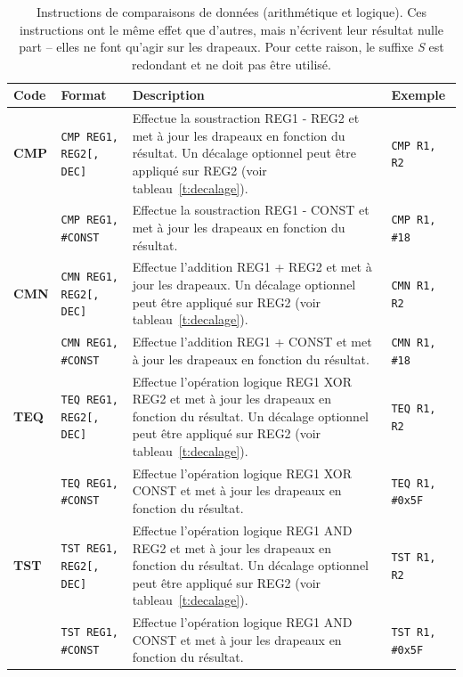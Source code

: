 \documentclass{tufte-handout}
\begin{document}
\begin{table}
\begin{tabular}{l|l|p{7.5cm}l}
Code & Format & Description & Exemple \\ \hline
 \textbf{CMP} & \texttt{CMP REG1, REG2[, DEC]} 	& Effectue la soustraction REG1 - REG2 et met à jour les drapeaux en fonction du résultat. Un décalage optionnel peut être appliqué sur REG2 (voir tableau~\ref{t:decalage}). & \texttt{CMP R1, R2} \\
 			 & \texttt{CMP REG1, \#CONST} 			& Effectue la soustraction REG1 - CONST et met à jour les drapeaux en fonction du résultat. & \texttt{CMP R1, \#18} \\ \hline
\textbf{CMN} & \texttt{CMN REG1, REG2[, DEC]} 	& Effectue l'addition REG1 + REG2 et met à jour les drapeaux. Un décalage optionnel peut être appliqué sur REG2 (voir tableau~\ref{t:decalage}). & \texttt{CMN R1, R2} \\
 			 & \texttt{CMN REG1, \#CONST} 			& Effectue l'addition REG1 + CONST et met à jour les drapeaux en fonction du résultat. & \texttt{CMN R1, \#18} \\
\hline
\textbf{TEQ} & \texttt{TEQ REG1, REG2[, DEC]} 	& Effectue l'opération logique REG1 XOR REG2 et met à jour les drapeaux en fonction du résultat. Un décalage optionnel peut être appliqué sur REG2 (voir tableau~\ref{t:decalage}). & \texttt{TEQ R1, R2} \\
 			 & \texttt{TEQ REG1, \#CONST} 			& Effectue l'opération logique REG1 XOR CONST et met à jour les drapeaux en fonction du résultat. & \texttt{TEQ R1, \#0x5F} \\
\hline
\textbf{TST} & \texttt{TST REG1, REG2[, DEC]} 	& Effectue l'opération logique REG1 AND REG2 et met à jour les drapeaux en fonction du résultat. Un décalage optionnel peut être appliqué sur REG2 (voir tableau~\ref{t:decalage}). & \texttt{TST R1, R2} \\
 			 & \texttt{TST REG1, \#CONST} 			& Effectue l'opération logique REG1 AND CONST et met à jour les drapeaux en fonction du résultat. & \texttt{TST R1, \#0x5F} \\ \hline

\end{tabular}
\label{t:datacmp}

\caption{Instructions de comparaisons de données (arithmétique et logique). Ces instructions ont le même effet que d'autres, mais n'écrivent leur résultat nulle part -- elles ne font qu'agir sur les drapeaux. Pour cette raison, le suffixe \textit{S} est redondant et ne doit pas être utilisé.}
\end{table}
\end{document}

